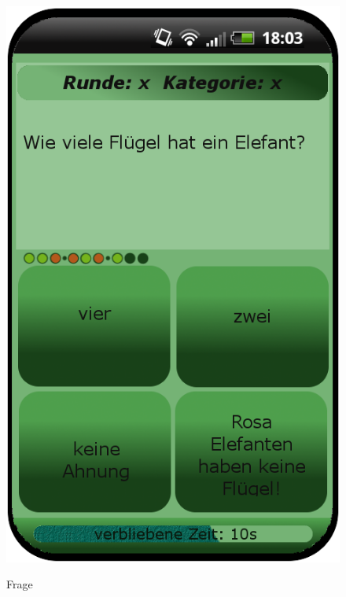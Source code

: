 \documentclass[fontsize=12pt,paper=a4,twoside]{scrartcl}
\begin{document}
\begin{figure}
	[H] \caption{Frage} 
	\includegraphics[width=0.5
	\textwidth]{Bilder/QuizzQuestion.png} \label{pic:ques} 
\end{figure}
\end{document}
